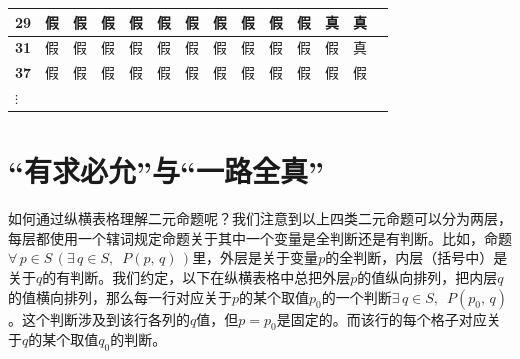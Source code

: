 \documentclass[12pt,UTF8,fontset=none]{ctexbook}
\begin{document}
{\begin{longtable}{|>{\centering\arraybackslash}p{0.7cm}|*{12}{C|}C}
\textbf{29} & 假 & 假 & 假 & 假 & 假 & 假 & 假 & 假 & 假 & 假 & 真 & 真 & \\ \hline
\textbf{31} & 假 & 假 & 假 & 假 & 假 & 假 & 假 & 假 & 假 & 假 & 假 & 真 & \\ \hline
\textbf{37} & 假 & 假 & 假 & 假 & 假 & 假 & 假 & 假 & 假 & 假 & 假 & 假 & \\ \hline 
$\mathbf{\vdots}$  &    &    &    &    &    &    &    &    &    &    &    &  
\end{longtable}
}

\section{“有求必允”与“一路全真”}

如何通过纵横表格理解二元命题呢？我们注意到以上四类二元命题可以分为两层，每层都使用一个辖词规定命题关于其中一个变量是全判断还是有判断。比如，命题$\forall \, p\in S \, (\exists \,q\in S, \,\,\, P(p,\,q)\,)$里，外层是关于变量$p$的全判断，内层（括号中）是关于$q$的有判断。我们约定，以下在纵横表格中总把外层$p$的值纵向排列，把内层$q$的值横向排列，那么每一行对应关于$p$的某个取值$p_0$的一个判断$\exists \,q\in S, \,\,\, P(p_0,\,q)$。这个判断涉及到该行各列的$q$值，但$p=p_0$是固定的。而该行的每个格子对应关于$q$的某个取值$q_0$的判断。
\end{document}
